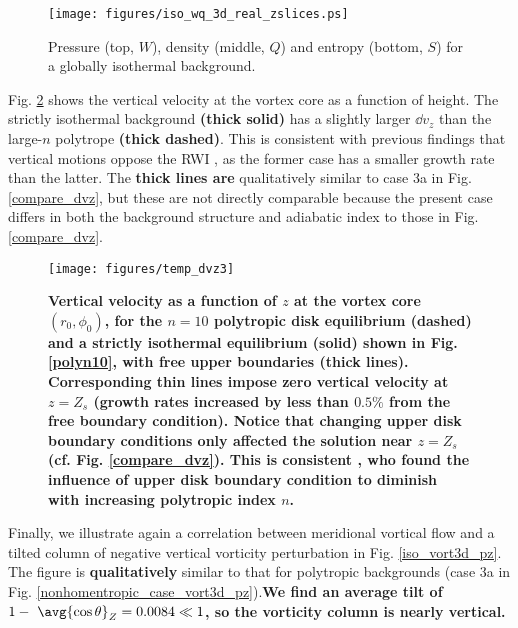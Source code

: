 \begin{figure}[!t]
  \centering
  \texttt{[image: figures/iso\_wq\_3d\_real\_zslices.ps]}
  \caption{Pressure (top, $W$), density (middle, $Q$) and entropy
    (bottom, $S$) for a globally isothermal background. 
    \label{isothermal_case}}
\end{figure}

  Fig. \ref{polyn10_vz} shows the vertical 
  velocity at the vortex core as a function of height. The strictly
  isothermal background {\bf (thick solid)} has a slightly larger $\dd v_z$ than the
  large-$n$ polytrope {\bf (thick dashed)}. This is consistent 
  with previous findings that vertical motions oppose the RWI
  \citep{lin12c}, as the former case has a smaller growth rate than
  the latter. The {\bf thick lines are} qualitatively similar to case
  3a in Fig. \ref{compare_dvz}, but these are not directly comparable 
  because the present case differs in both the background structure and adiabatic index  to 
  those in Fig. \ref{compare_dvz}. 
  
  \begin{figure}[!t]
    \centering
    \texttt{[image: figures/temp\_dvz3]}
    \caption{
      {\bf
        Vertical velocity as a function of $z$ at the vortex core
        $(r_0,\phi_0)$, for the $n=10$ 
        polytropic disk equilibrium (dashed) and a strictly isothermal
        equilibrium (solid) shown in 
        Fig. \ref{polyn10}, with free upper boundaries (thick lines). Corresponding thin 
        lines impose zero vertical velocity at $z=Z_s$ (growth rates increased by less than $0.5\%$ from the free boundary condition).
        Notice that changing upper disk boundary conditions only 
        affected the solution near $z=Z_s$ (cf. Fig. \ref{compare_dvz}). 
        This is consistent \cite{lin12c}, who found the
        influence of upper disk boundary condition to diminish with
        increasing polytropic index $n$. 
      }
      \label{polyn10_vz}}
\end{figure}
  
  Finally, we illustrate again a correlation 
  between meridional vortical flow and a tilted column of negative
  vertical vorticity perturbation in Fig. \ref{iso_vort3d_pz}. The figure is
  {\bf qualitatively} similar to that for polytropic backgrounds (case 3a in
  Fig. \ref{nonhomentropic_case_vort3d_pz}).{\bf  We find an average tilt
    of $1-~\avg{\cos{\theta}}_Z=0.0084
    \ll1$, so the vorticity column is nearly vertical.} 
  
